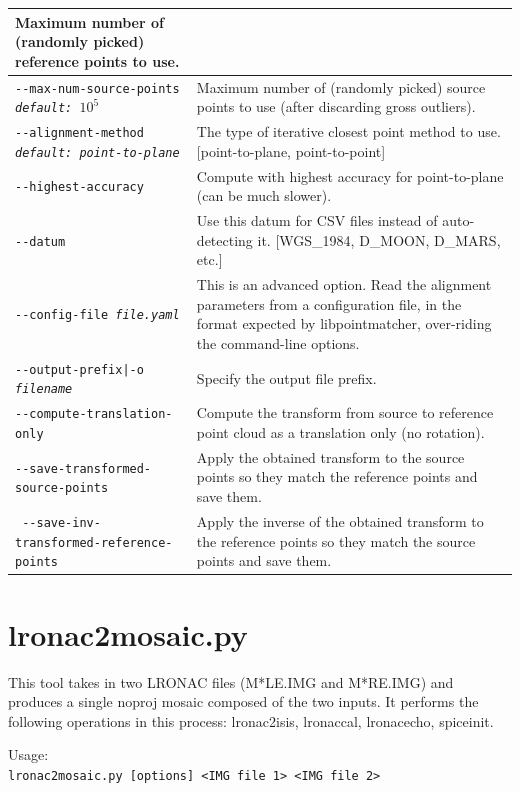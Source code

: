 \begin{longtable}{|p{8cm}|p{9cm}|}
Maximum number of (randomly picked) reference points to use. \\ \hline
\texttt{-\/-max-num-source-points \textit{default: $10^5$}} & Maximum number of (randomly picked) source points to use (after discarding gross outliers). \\ \hline
\texttt{-\/-alignment-method \textit{default: point-to-plane}} & The type of iterative closest point
method to use. [point-to-plane, point-to-point]\\ \hline
\texttt{-\/-highest-accuracy} & Compute with highest accuracy for point-to-plane (can be much slower). \\ \hline
\texttt{-\/-datum \textit{}} & Use this datum for CSV files instead of
auto-detecting it. [WGS\_1984, D\_MOON, D\_MARS, etc.] \\ \hline
\texttt{-\/-config-file \textit{file.yaml}} & This is an advanced
option. Read the alignment parameters from a configuration file, in the
format expected by libpointmatcher, over-riding the command-line options.\\ \hline
\texttt{-\/-output-prefix|-o \textit{filename}} & Specify the output file prefix. \\ \hline
\texttt{-\/-compute-translation-only} & Compute the transform from source to reference point cloud as a translation only (no rotation). \\ \hline
\texttt{-\/-save-transformed-source-points} & Apply the obtained transform to the source points so they match the reference points and save them. \\ \hline
\texttt{ -\/-save-inv-transformed-reference-points} & Apply the inverse of the obtained transform to the reference points so they match the source points and save them.
\\ \hline
\end{longtable}




\section{lronac2mosaic.py}
\label{lronac2mosaic}

This tool takes in two LRONAC files (M*LE.IMG and M*RE.IMG) and produces a single noproj mosaic composed of the two inputs.  It performs the following operations in this process: lronac2isis, lronaccal, lronacecho, spiceinit.

\medskip

Usage:\\
\hspace*{2em}\texttt{lronac2mosaic.py [options] <IMG file 1> <IMG file 2>}

